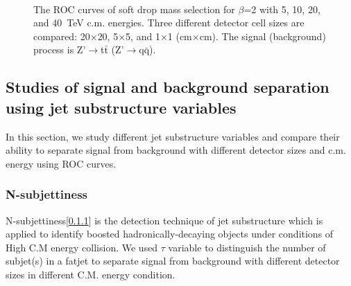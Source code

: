 \documentclass[12pt,twoside,a4paper,an,final]{cms-tdr}
\begin{document}
\begin{figure}
\begin{center}
  \\
\end{center}
\caption{
The ROC curves of soft drop mass selection for $\beta$=2
with 5, 10, 20, and 40~TeV c.m. energies. 
Three different detector cell sizes are compared: 20$\times$20, 
5$\times$5, and 1$\times$1 (cm$\times$cm). 
The signal (background) process is Z'$\rightarrow$t$\bar{\mathrm{t}}$
(Z'$\rightarrow$q$\bar{\mathrm{q}}$).
}
\label{fig:cluster_mass_sdb2_tt_ROC}
\end{figure}
\subsection{Studies of signal and background separation using jet substructure variables}
In this section, we study different jet substructure variables and compare their ability to separate signal from background with different detector sizes and c.m. energy using ROC curves.\\

\subsubsection{N-subjettiness}
N-subjettiness[\ref{}] is the detection technique of jet substructure which is applied to identify boosted hadronically-decaying objects under conditions of High C.M energy collision. We used $\tau$ variable to distinguish the number of subjet(s) in a fatjet to separate signal from background with different detector sizes in different C.M. energy condition.\\
\end{document}
